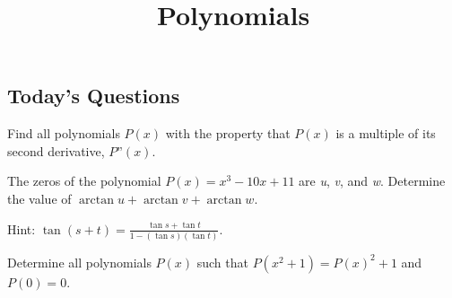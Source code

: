 \documentclass{article}
\begin{document}
\title{Polynomials}
\author{}
\date{}
\maketitle


\subsection*{Today{'}s Questions}










Find all polynomials \(P(x)\) with the property that \(P(x)\) is a multiple of its second derivative, \(P\text{''}(x)\).

 { }The zeros of the polynomial \(P(x) = x^3 - 10x + 11\) are \textit{ u}, \textit{ v}, and\textit{  w}. Determine the value of \(\arctan  u + \arctan
 v + \arctan  w\). { } { } { }$\quad $

Hint: \(\tan (s+t)=\frac{\tan  s + \tan  t }{1-(\tan  s )(\tan  t)}\).

Determine all polynomials \(P(x)\) such that \(P\left(x^2+1\right)=P(x)^2+1\) and { }\(P(0)=0\).
\end{document}
